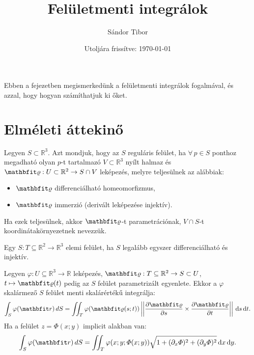 \documentclass[lang=magyar]{math-handout}
\title{Felületmenti integrálok}
\date{Utoljára frissítve: \today}
\author{Sándor Tibor}
\begin{document}
\allowdisplaybreaks

\maketitle

\vspace{1em}

\begin{summary}
  Ebben a fejezetben megismerkedünk a felületmenti integrálok fogalmával, és
  azzal, hogy hogyan számíthatjuk ki őket.
\end{summary}

\vspace{-1em}

\section{Elméleti áttekinő}

\vspace{1em}

\begin{definition}
  Legyen $S \subset  \mathbb R^3$. Azt mondjuk, hogy az $S$ reguláris felület,
  ha $\forall \, p \in S$ ponthoz megadható olyan $p$-t tartalmazó $V \subset
    \mathbb R^3$ nyílt halmaz és $\rvec \varrho : U \subset \mathbb R^2
    \rightarrow S \cap V$ leképezés, melyre teljesülnek az alábbiak:
  \begin{itemize}
    \item $\rvec \varrho$ differenciálható homeomorfizmus,

    \item $\rvec \varrho$ immerzió (derivált leképezése injektív).
  \end{itemize}
  Ha ezek teljesülnek, akkor $\rvec \varrho$-t parametrációnak,
  $V \cap S$-t  koordinátakörnyezetnek nevezzük.
\end{definition}

\vfill

\begin{definition}
  Egy $S: T \subseteq \mathbb R^2 \rightarrow \mathbb R^3$ elemi felület, ha
  $S$ legalább egyszer differenciálható és injektív.
\end{definition}

\vfill

\begin{definition}
  Legyen $\varphi: U \subseteq \mathbb R^3 \rightarrow \mathbb R$ leképezés,
  $\rvec \varrho: T \subseteq \mathbb R^2 \rightarrow S \subset U$, $t \mapsto
    \rvec \varrho(t)$ pedig az $S$ felület parametrizált egyenlete. Ekkor a
  $\varphi$ skalármező $S$ felület menti skalárértékű integrálja:
  \[
    \int_S \varphi (\rvec r) \, dS =
    \iint_T \varphi (\rvec \varrho(s; t))
    \norma{\pdv{\rvec \varrho}{s} \times \pdv{\rvec \varrho}{t}}
    \, \diff s \, \diff t
    \text.
  \]
  Ha a felület $z = \varPhi(x; y)$ implicit alakban van:
  \[
    \int_S \varphi (\rvec r) \, dS =
    \iint_T \varphi (x; y; \varPhi(x;y))
    \sqrt{1 + (\partial_x \varPhi)^2 + (\partial_y \varPhi)^2}
    \, \diff x \, \diff y
    \text.
  \]
\end{definition}
\end{document}
